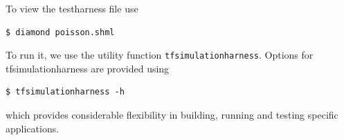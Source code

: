 To view the testharness file use
\begin{lstlisting}[style=Bash]
 $ diamond poisson.shml
\end{lstlisting} %
To run it, we use the utility function
\texttt{tfsimulationharness}.  Options for tfsimulationharness are
provided using 
\begin{lstlisting}[style=Bash]
$ tfsimulationharness -h
\end{lstlisting} %
%
%
%
which provides considerable flexibility in building, running and
testing specific applications. %

